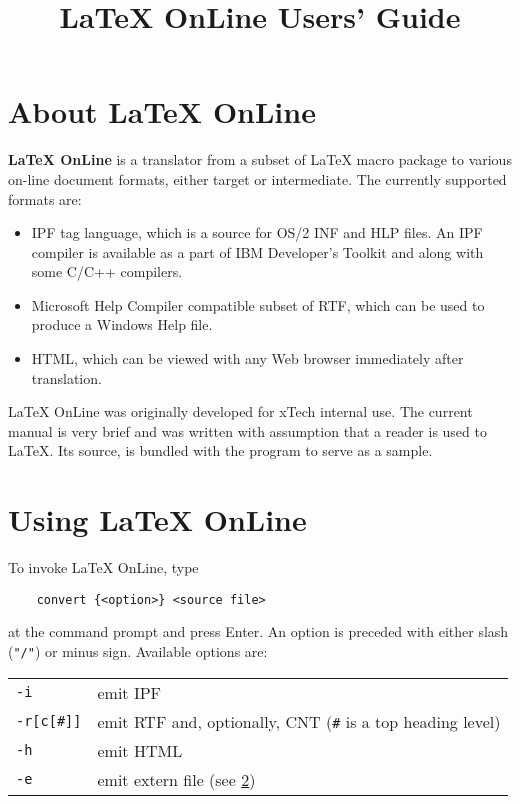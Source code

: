 \newif\ifonline


\title{LaTeX OnLine Users' Guide}

\newcommand{\LO}{LaTeX OnLine}

\setlength{\parindent}{0 pt}
\setlength{\parskip}{6 pt}



\noindent

\chapter{About LaTeX OnLine}

{\bf \LO} is a translator from a subset of \LaTeX{}
macro package to various on-line document formats, either
target or intermediate. The currently supported formats are:

\begin{itemize}
\item IPF tag language, which is a source for OS/2 INF and
      HLP files. An IPF compiler is available as a part of IBM
      Developer's Toolkit and along with some C/C++ compilers.
\item Microsoft Help Compiler compatible subset of RTF,
      which can be used to produce a Windows Help file.
\item HTML, which can be viewed with any Web browser
      immediately after translation.
\end{itemize}

\LO{} was originally developed for xTech internal use.
The current manual is very brief and was written with assumption
that a reader is used to \LaTeX{}. Its source, is bundled with the
program to serve as a sample.

\chapter{Using \LO{}}

To invoke \LO{}, type

\verb'    convert {<option>} <source file>'

at the command prompt and press Enter. An option is
preceded with either slash (\verb'"/"') or minus sign.
Available options are:

\begin{center}
\begin{tabular}{ll}
\verb'-i'    & emit IPF   \\
\verb'-r[c[#]]' & emit RTF and, optionally, CNT (\verb'#' is a top heading level) \\
\verb'-h'    & emit HTML  \\
\verb'-e'    & emit extern file (see \ref{})
\end{tabular}
\end{center}

